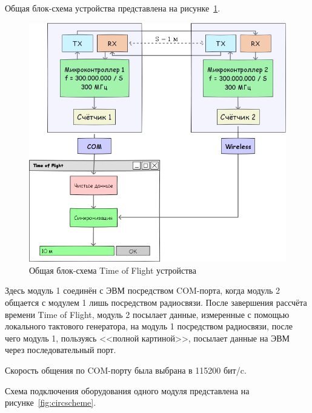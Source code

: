 Общая блок-схема устройства представлена на рисунке~\ref{fig:commonscheme}.

\begin{figure}[ht]
    \includegraphics[width=1\linewidth]{Figures/commonscheme.png}
    \caption{Общая блок-схема Time of Flight устройства}
    \label{fig:commonscheme}
\end{figure}

Здесь модуль 1 соединён с ЭВМ посредством COM-порта, когда модуль 2 общается с модулем 1 лишь посредством радиосвязи. После завершения рассчёта времени Time of Flight, модуль 2 посылает данные, измеренные с помощью локального тактового генератора, на модуль 1 посредством радиосвязи, после чего модуль 1, пользуясь <<полной картиной>>, посылает данные на ЭВМ через последовательный порт.

Скорость общения по COM-порту была выбрана в 115200 бит/c.

Схема подключения оборудования одного модуля представлена на рисунке~\ref{fig:circscheme}.

